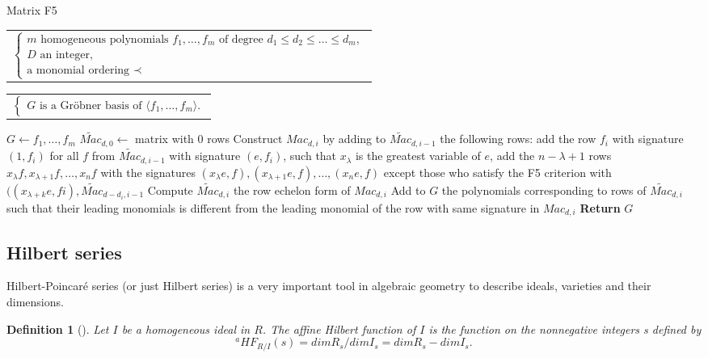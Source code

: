 \documentclass[english]{article}
\newtheorem{definition}{Definition}[section]
\begin{document}
		\begin{algorithm}
			\caption{Matrix F5}\label{alg:matrix_f5}
			\begin{algorithmic}[1]
				\Require 
				\begin{tabular}[t]{@{}l@{}}
					$\left\{ 
					\begin{array}{l}
						m \text{ homogeneous polynomials } f_1, \dots, f_m \text{ of degree } d_1 \leq d_2 \leq \dots \leq d_m, \\
						D \text{ an integer}, \\
						\text{a monomial ordering } \prec
					\end{array}
					\right.$
				\end{tabular}
				\Ensure 
				\begin{tabular}[t]{@{}l@{}}
					$\left\{ 
					\begin{array}{l}
						G \text{ is a Gröbner basis of } \langle f_1,\dots,f_m \rangle.
					\end{array}
					\right.$
				\end{tabular}
				\State $G \gets {f_1,\dots,f_m}$
					\State $\widetilde{Mac}_{d, 0} \gets$ matrix with 0 rows
						\State Construct ${Mac}_{d, i}$ by adding to $\widetilde{Mac}_{d, i-1}$ the following rows:
							\State add the row $f_i$ with signature $(1, f_i)$
						\EndIf
							for all $f$ from $\widetilde{Mac}_{d, i-1}$ with signature $(e, f_i)$, such that $x_\lambda$ is the greatest variable of $e$, add the $n - \lambda + 1$ rows $x_\lambda f,x_{\lambda + 1}f,\dots,x_n f$ with the signatures $(x_\lambda e, f),(x_{\lambda + 1}e, f),\dots,(x_n e, f)$ except those who satisfy the F5 criterion with $((x_{\lambda + k}e, fi), \widetilde{Mac}_{d-d_i, i-1}$
						\EndIf
						\State Compute $\widetilde{Mac}_{d, i}$ the row echelon form of ${Mac}_{d, i}$
						\State Add to $G$ the polynomials corresponding to rows of $\widetilde{Mac}_{d, i}$ such that their leading
						\State monomials is different from the leading monomial of the row with 
						\State same signature in ${Mac}_{d, i}$
				 	\EndFor
				\EndFor
				\State \textbf{Return} $G$
			\end{algorithmic}
		\end{algorithm}
		
		\subsection{Hilbert series}
		Hilbert-Poincaré series (or just Hilbert series) is a very important tool in algebraic geometry to describe ideals, varieties and their dimensions.
		\begin{definition}[\cite{CLS}]
			Let $I$ be a homogeneous ideal in $R$. The affine Hilbert function of $I$ is the function on the nonnegative integers s defined by
			$$
				{}^a HF_{R/I}(s) = dim R_{s} / dim I_{s} = dim R_{s} - dim I_{s}.
			$$
		\end{definition}
		
\end{document}
